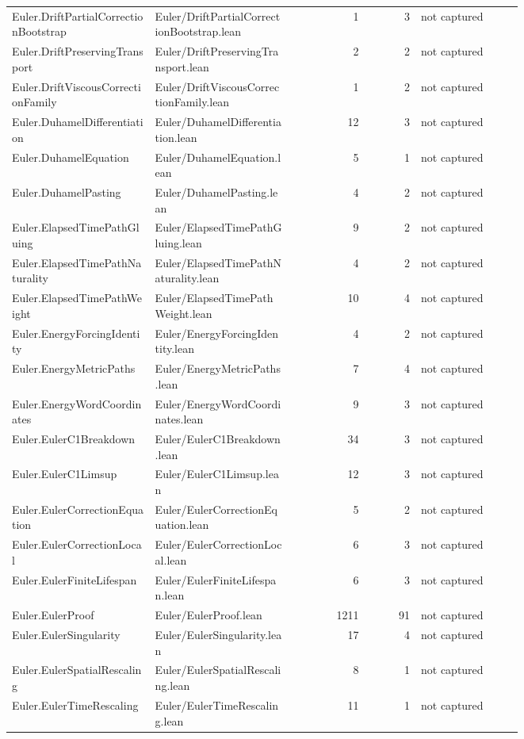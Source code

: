 \documentclass[10pt]{article}
\begin{document}
\begin{longtable}{p{0.28\linewidth}p{0.27\linewidth}r r p{0.20\linewidth}}
Euler.DriftPartialCorrectionBootstrap & Euler/DriftPartialCorrectionBootstrap.lean & 1 & 3 & not captured\\
Euler.DriftPreservingTransport & Euler/DriftPreservingTransport.lean & 2 & 2 & not captured\\
Euler.DriftViscousCorrectionFamily & Euler/DriftViscousCorrectionFamily.lean & 1 & 2 & not captured\\
Euler.DuhamelDifferentiation & Euler/DuhamelDifferentiation.lean & 12 & 3 & not captured\\
Euler.DuhamelEquation & Euler/DuhamelEquation.lean & 5 & 1 & not captured\\
Euler.DuhamelPasting & Euler/DuhamelPasting.lean & 4 & 2 & not captured\\
Euler.ElapsedTimePathGluing & Euler/ElapsedTimePathGluing.lean & 9 & 2 & not captured\\
Euler.ElapsedTimePathNaturality & Euler/ElapsedTimePathNaturality.lean & 4 & 2 & not captured\\
Euler.ElapsedTimePathWeight & Euler/ElapsedTimePathWeight.lean & 10 & 4 & not captured\\
Euler.EnergyForcingIdentity & Euler/EnergyForcingIdentity.lean & 4 & 2 & not captured\\
Euler.EnergyMetricPaths & Euler/EnergyMetricPaths.lean & 7 & 4 & not captured\\
Euler.EnergyWordCoordinates & Euler/EnergyWordCoordinates.lean & 9 & 3 & not captured\\
Euler.EulerC1Breakdown & Euler/EulerC1Breakdown.lean & 34 & 3 & not captured\\
Euler.EulerC1Limsup & Euler/EulerC1Limsup.lean & 12 & 3 & not captured\\
Euler.EulerCorrectionEquation & Euler/EulerCorrectionEquation.lean & 5 & 2 & not captured\\
Euler.EulerCorrectionLocal & Euler/EulerCorrectionLocal.lean & 6 & 3 & not captured\\
Euler.EulerFiniteLifespan & Euler/EulerFiniteLifespan.lean & 6 & 3 & not captured\\
Euler.EulerProof & Euler/EulerProof.lean & 1211 & 91 & not captured\\
Euler.EulerSingularity & Euler/EulerSingularity.lean & 17 & 4 & not captured\\
Euler.EulerSpatialRescaling & Euler/EulerSpatialRescaling.lean & 8 & 1 & not captured\\
Euler.EulerTimeRescaling & Euler/EulerTimeRescaling.lean & 11 & 1 & not captured\\

\end{longtable}
\end{document}
